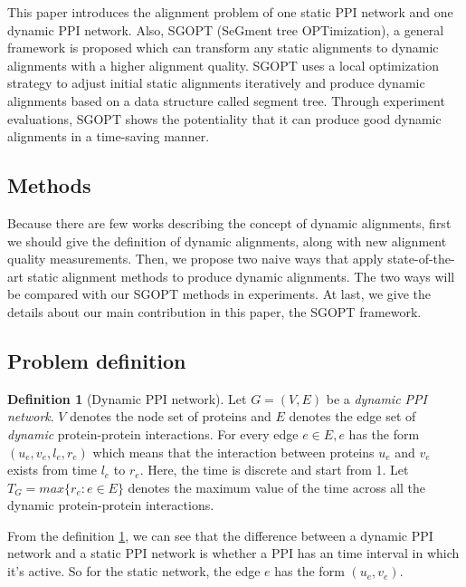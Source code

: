 \documentclass{bioinfo}
\theoremstyle{definition}
\newtheorem{defn}{\textbf{Definition}}[section]%
\begin{document}
This paper introduces the alignment problem of one static PPI network and one dynamic PPI network. Also, SGOPT (SeGment tree OPTimization), a general framework is proposed which can transform any static alignments to dynamic alignments with a higher alignment quality. SGOPT uses a local optimization strategy to adjust initial static alignments iteratively and produce dynamic alignments based on a data structure called segment tree. Through experiment evaluations, SGOPT shows the potentiality that it can produce good dynamic alignments in a time-saving manner.


\begin{methods}
\section{Methods}
Because there are few works describing the concept of dynamic alignments, first we should give the definition of dynamic alignments, along with new alignment quality measurements. Then, we propose two naive ways that apply state-of-the-art static alignment methods to produce dynamic alignments. The two ways will be compared with our SGOPT methods in experiments. At last, we give the details about our main contribution in this paper, the SGOPT framework.
\subsection{Problem definition}
\begin{defn}[Dynamic PPI network]
\label{defndppi}
Let $G=(V,E)$ be a \textit{dynamic PPI network}. $V$ denotes the node set of proteins and $E$ denotes the edge set of \textit{dynamic} protein-protein interactions. For every edge $e\in E, e$ has the form $(u_e,v_e,l_e,r_e)$ which means that the interaction between proteins $u_e$ and $v_e$ exists from time $l_e$ to $r_e$. Here, the time is discrete and start from 1. Let $T_G=max\{r_e: e\in E\}$ denotes the maximum value of the time across all the dynamic protein-protein interactions.
\end{defn}

From the definition \ref{defndppi}, we can see that the difference between a dynamic PPI network and a static PPI network is whether a PPI has an time interval in which it's active. So for the static network, the edge $e$ has the form $(u_e,v_e)$.


\end{methods}
\end{document}
